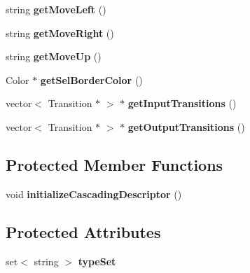 \begin{CompactItemize}
\item 
string \textbf{getMoveLeft} ()\label{classbr_1_1pucrio_1_1telemidia_1_1ginga_1_1ncl_1_1model_1_1presentation_1_1CascadingDescriptor_2f73899afcce27e08397289d95b39942}

\item 
string \textbf{getMoveRight} ()\label{classbr_1_1pucrio_1_1telemidia_1_1ginga_1_1ncl_1_1model_1_1presentation_1_1CascadingDescriptor_6d0541cc4367be442bd4cfc887d41776}

\item 
string \textbf{getMoveUp} ()\label{classbr_1_1pucrio_1_1telemidia_1_1ginga_1_1ncl_1_1model_1_1presentation_1_1CascadingDescriptor_c31a3afe50195b3927a0f97a7fb53e12}

\item 
Color $\ast$ \textbf{getSelBorderColor} ()\label{classbr_1_1pucrio_1_1telemidia_1_1ginga_1_1ncl_1_1model_1_1presentation_1_1CascadingDescriptor_39ef7929058061cf666ede7593600ef2}

\item 
vector$<$ Transition $\ast$ $>$ $\ast$ \textbf{getInputTransitions} ()\label{classbr_1_1pucrio_1_1telemidia_1_1ginga_1_1ncl_1_1model_1_1presentation_1_1CascadingDescriptor_7f870d7adf9a9d55adcb69e2e70bd45c}

\item 
vector$<$ Transition $\ast$ $>$ $\ast$ \textbf{getOutputTransitions} ()\label{classbr_1_1pucrio_1_1telemidia_1_1ginga_1_1ncl_1_1model_1_1presentation_1_1CascadingDescriptor_58ee7cacd3d4c17b213455b7ea47401a}

\end{CompactItemize}
\subsection*{Protected Member Functions}
\begin{CompactItemize}
\item 
void \textbf{initializeCascadingDescriptor} ()\label{classbr_1_1pucrio_1_1telemidia_1_1ginga_1_1ncl_1_1model_1_1presentation_1_1CascadingDescriptor_9aa9c7693aeab52efdd5d2f2ca4d80ba}

\end{CompactItemize}
\subsection*{Protected Attributes}
\begin{CompactItemize}
\item 
set$<$ string $>$ {\bf typeSet}\label{classbr_1_1pucrio_1_1telemidia_1_1ginga_1_1ncl_1_1model_1_1presentation_1_1CascadingDescriptor_145b3afaa194308141d367cc1393d565}

\end{CompactItemize}
